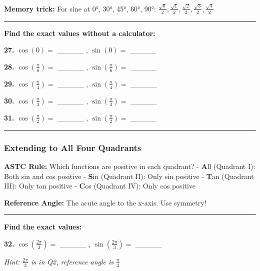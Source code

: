 \documentclass[
  11pt,
]{article}
\begin{document}
\textbf{Memory trick:} For sine at 0°, 30°, 45°, 60°, 90°:
\(\frac{\sqrt{0}}{2}, \frac{\sqrt{1}}{2}, \frac{\sqrt{2}}{2}, \frac{\sqrt{3}}{2}, \frac{\sqrt{4}}{2}\)

\begin{center}\rule{0.5\linewidth}{0.5pt}\end{center}

\textbf{Find the exact values without a calculator:}

\textbf{27.} \(\cos(0) ={}\) \_\_\_\_\_ , \(\sin(0) ={}\) \_\_\_\_\_

\textbf{28.} \(\cos\left(\frac{\pi}{6}\right) ={}\) \_\_\_\_\_ ,
\(\sin\left(\frac{\pi}{6}\right) ={}\) \_\_\_\_\_

\textbf{29.} \(\cos\left(\frac{\pi}{4}\right) ={}\) \_\_\_\_\_ ,
\(\sin\left(\frac{\pi}{4}\right) ={}\) \_\_\_\_\_

\textbf{30.} \(\cos\left(\frac{\pi}{3}\right) ={}\) \_\_\_\_\_ ,
\(\sin\left(\frac{\pi}{3}\right) ={}\) \_\_\_\_\_

\textbf{31.} \(\cos\left(\frac{\pi}{2}\right) ={}\) \_\_\_\_\_ ,
\(\sin\left(\frac{\pi}{2}\right) ={}\) \_\_\_\_\_

\begin{center}\rule{0.5\linewidth}{0.5pt}\end{center}

\hypertarget{extending-to-all-four-quadrants}{%
\subsubsection{Extending to All Four
Quadrants}\label{extending-to-all-four-quadrants}}

\textbf{ASTC Rule:} Which functions are positive in each quadrant? -
\textbf{A}ll (Quadrant I): Both sin and cos positive - \textbf{S}in
(Quadrant II): Only sin positive - \textbf{T}an (Quadrant III): Only tan
positive - \textbf{C}os (Quadrant IV): Only cos positive

\textbf{Reference Angle:} The acute angle to the x-axis. Use symmetry!

\begin{center}\rule{0.5\linewidth}{0.5pt}\end{center}

\textbf{Find the exact values:}

\textbf{32.} \(\cos\left(\frac{2\pi}{3}\right) ={}\) \_\_\_\_\_ ,
\(\sin\left(\frac{2\pi}{3}\right) ={}\) \_\_\_\_\_

\emph{Hint: \(\frac{2\pi}{3}\) is in Q2, reference angle is
\(\frac{\pi}{3}\)}
\end{document}
